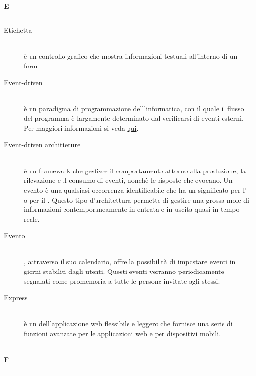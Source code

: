 \documentclass[12pt,a4paper]{article}
\begin{document}
\newpage

\begin{center}
\hfill\\
	\LARGE \textbf{E}
\hfill\\
\rule[15pt]{30pt}{0.5pt}
\end{center}

\begin{description}
\item[Etichetta] 
\hfill\\ è un controllo grafico che mostra informazioni testuali all'interno di un form.

\item[Event-driven] 
\hfill\\ è un paradigma di programmazione dell'informatica, con il quale il flusso del programma è largamente determinato dal verificarsi di eventi esterni. Per maggiori informazioni si veda \href{https://it.wikipedia.org/wiki/Programmazione_a_eventi}{qui}.

\item[Event-driven architteture] 
\hfill\\è un framework che gestisce il comportamento attorno alla produzione, la rilevazione e il consumo di eventi, nonchè le risposte che evocano. Un evento è una qualsiasi occorrenza identificabile che ha un significato per l' o per il . Questo tipo d'architettura  permette di gestire  una grossa mole di informazioni contemporaneamente  in entrata e in uscita quasi in tempo reale.

\item[Evento] 
\hfill\\ , attraverso il suo calendario, offre la possibilità di impostare eventi in giorni stabiliti dagli utenti. Questi eventi verranno periodicamente segnalati come promemoria a tutte le persone invitate agli stessi.

\item[Express] 
\hfill\\è un  dell'applicazione web  flessibile e leggero che fornisce una serie di funzioni avanzate per le applicazioni web e per dispositivi mobili.
\end{description}

\newpage

\begin{center}
\hfill\\
	\LARGE \textbf{F}
\hfill\\
\rule[15pt]{30pt}{0.5pt}
\end{center}
\end{document}
